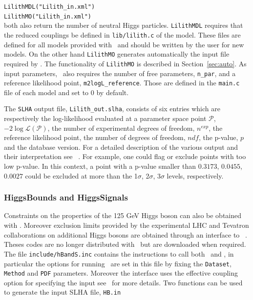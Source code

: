 \documentclass[12pt,a4paper]{article}
\begin{document}
{\noindent
\verb|LilithMDL("Lilith_in.xml")|\\
\verb|LilithMO("Lilith_in.xml")|\\

\noindent 
both also return the number of neutral Higgs particles.  
\verb|LilithMDL| requires that the  reduced couplings be defined in \verb|lib/lilith.c| of the model. These files are defined for all models provided with \micro\ and should be written by the user for new models. On the other hand \verb|LilithMO|  generates automatically the input file required by \lilith.
The functionality of \verb|LilithMO| is described in Section~\ref{sec:auto}. As input parameters, \lilith\ also requires 
 the number of free parameters, \verb|n_par|, and  a reference likelihood point, \verb|m2logL_reference|. Those are defined in the \verb|main.c| file of each model and set to 0 by default.

The {\tt SLHA} output file, \verb|Lilith_out.slha|, consists of six entries which are respectively the log-likelihood evaluated at a parameter space point $\mathcal{P}$, $-2\log\mathcal{L}(\mathcal{P})$, the number of experimental degrees of freedom, $n^{exp}$, the reference likelihood point,  the number of degrees of freedom, $ndf$, the p-value, $p$ and the database version.
 For a detailed description of the various output and their interpretation see ~\cite{Bernon:2015hsa}. For example, one could flag or exclude points with too low p-value. In this context, a point with a p-value smaller than $0.3173$, $0.0455$, $0.0027$ could be excluded at more than the 1$\sigma$, 2$\sigma$, 3$\sigma$ levels, respectively.


\subsubsection{HiggsBounds and HiggsSignals}

Constraints on the properties of the 125 GeV Higgs boson can also  be obtained with \HS.
Moreover exclusion limits provided by the experimental LHC and Tevatron collaborations on additional Higgs bosons are obtained through an interface to \HB~\cite{Bechtle:2011sb}.
Theses codes are no longer distributed with \micro\ but are downloaded when required. 
The file {\tt include/hBandS.inc}  contains the instructions  to call both \HB\ and \HS,  in particular the options for running \HS\ are set in this file by  fixing the  \verb|Dataset|, \verb|Method| and
\verb|PDF| parameters. Moreover the interface uses  the effective coupling option for specifying the input see~\cite{Bechtle:2013wla} for more details. 
Two  functions can be used to generate the input SLHA file, \verb|HB.in|\\

}
\end{document}
